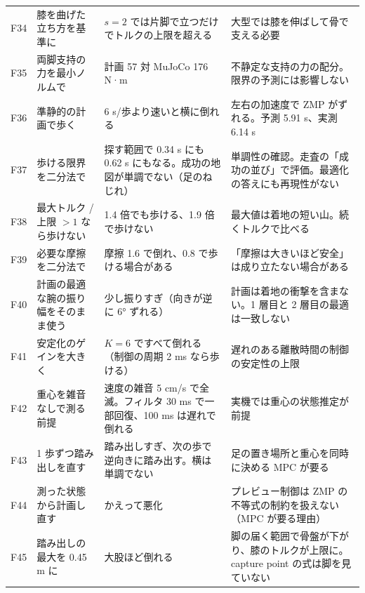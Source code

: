 \documentclass[paper=a4paper,fontsize=10pt,twocolumn,column_gap=2zw,line_length=24zw,number_of_lines=46,head_space=20mm]{jlreq}
\begin{document}
\begin{table}[t]
\begin{tabular}{cp{}p{}p{}}
F34 & 膝を曲げた立ち方を基準に & $s=2$ では片脚で立つだけでトルクの上限を超える & 大型では膝を伸ばして骨で支える必要 \\
F35 & 両脚支持の力を最小ノルムで & 計画 57 対 MuJoCo 176 N·m & 不静定な支持の力の配分。限界の予測には影響しない \\
F36 & 準静的の計画で歩く & 6 s/歩より速いと横に倒れる & 左右の加速度で ZMP がずれる。予測 5.91 s、実測 6.14 s \\
F37 & 歩ける限界を二分法で & 探す範囲で 0.34 s にも 0.62 s にもなる。成功の地図が単調でない（足のねじれ） & 単調性の確認。走査の「成功の並び」で評価。最適化の答えにも再現性がない \\
F38 & 最大トルク / 上限 $>1$ なら歩けない & 1.4 倍でも歩ける、1.9 倍で歩けない & 最大値は着地の短い山。続くトルクで比べる \\
F39 & 必要な摩擦を二分法で & 摩擦 1.6 で倒れ、0.8 で歩ける場合がある & 「摩擦は大きいほど安全」は成り立たない場合がある \\
F40 & 計画の最適な腕の振り幅をそのまま使う & 少し振りすぎ（向きが逆に 6° ずれる） & 計画は着地の衝撃を含まない。1 層目と 2 層目の最適は一致しない \\
F41 & 安定化のゲインを大きく & $K=6$ ですべて倒れる（制御の周期 2 ms なら歩ける） & 遅れのある離散時間の制御の安定性の上限 \\
F42 & 重心を雑音なしで測る前提 & 速度の雑音 5 cm/s で全滅。フィルタ 30 ms で一部回復、100 ms は遅れで倒れる & 実機では重心の状態推定が前提 \\
F43 & 1 歩ずつ踏み出しを直す & 踏み出しすぎ、次の歩で逆向きに踏み出す。横は単調でない & 足の置き場所と重心を同時に決める MPC が要る \\
F44 & 測った状態から計画し直す & かえって悪化 & プレビュー制御は ZMP の不等式の制約を扱えない（MPC が要る理由） \\
F45 & 踏み出しの最大を 0.45 m に & 大股ほど倒れる & 脚の届く範囲で骨盤が下がり、膝のトルクが上限に。capture point の式は脚を見ていない \\\bottomrule
\end{tabular}
\end{table}
\end{document}
